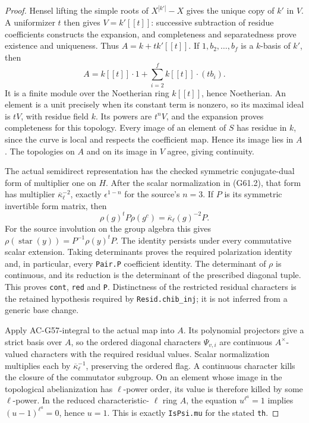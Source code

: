 \begin{proof}
Hensel lifting the simple roots of \(X^{|k'|}-X\) gives the unique
copy of \(k'\) in \(V\).  A uniformizer \(t\) then gives
\(V=k'[[t]]\): successive subtraction of residue coefficients
constructs the expansion, and completeness and separatedness prove
existence and uniqueness.  Thus
\(A=k+t k'[[t]]\).  If \(1,b_2,\ldots,b_f\) is a
\(k\)-basis of \(k'\), then
\[
 A=k[[t]]\cdot1+\sum_{i=2}^f k[[t]]\cdot(tb_i).
 \tag{G61.4}
\]
It is a finite module over the Noetherian ring \(k[[t]]\), hence
Noetherian.  An element is a unit precisely when its constant term
is nonzero, so its maximal ideal is \(tV\), with residue field
\(k\).  Its powers are \(t^nV\), and the expansion proves
completeness for this topology.  Every image of an element of \(S\)
has residue in \(k\), since the curve is local and respects the
coefficient map.  Hence its image lies in \(A\).  The topologies
on \(A\) and on its image in \(V\) agree, giving continuity.

The actual semidirect representation has the checked symmetric
conjugate-dual form of multiplier one on \(H\).  After the scalar
normalization in (G61.2), that form has multiplier
\(\overline\kappa_\ell^{-2}\), exactly
\(\epsilon^{1-n}\) for the source's \(n=3\).
If \(P\) is its symmetric invertible form matrix, then
\[
 \rho(g)^tP\rho(g^c)=\overline\kappa_\ell(g)^{-2}P.
 \tag{G61.5}
\]
For the source involution on the group algebra this gives
\(\rho(\operatorname{star}(y))=P^{-1}\rho(y)^tP\).
The identity persists under every commutative scalar extension.
Taking determinants proves the required polarization identity and,
in particular, every \texttt{Pair.P} coefficient identity.
The determinant of \(\rho\) is continuous, and its reduction is
the determinant of the prescribed diagonal tuple.  This proves
\texttt{cont}, \texttt{red} and \texttt{P}.  Distinctness of the
restricted residual characters is the retained hypothesis required
by \texttt{Resid.chib\_inj}; it is not inferred from a generic
base change.

Apply AC-G57-integral to the actual map into \(A\).  Its polynomial
projectors give a strict basis over \(A\), so the ordered diagonal
characters \(\Psi_{v,i}\) are continuous \(A^\times\)-valued
characters with the required residual values.  Scalar normalization
multiplies each by \(\overline\kappa_\ell^{-1}\), preserving the
ordered flag.  A continuous character kills the closure of the
commutator subgroup.  On an element whose image in the topological
abelianization has \(\ell\)-power order, its value is therefore
killed by some \(\ell\)-power.  In the reduced characteristic-
\(\ell\) ring \(A\), the equation \(u^{\ell^a}=1\)
implies \((u-1)^{\ell^a}=0\), hence \(u=1\).
This is exactly \texttt{IsPsi.mu} for the stated \texttt{th}.


\end{proof}
